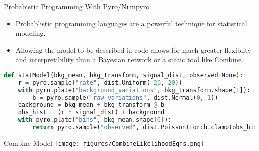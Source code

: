 \documentclass[10pt]{beamer}
\begin{document}
\begin{frame}[fragile]{Probabistic Programming With Pyro/Numpyro}
  \begin{itemize}
  \item Probablistic programming languages are a powerful technique for statistical modeling.
  \item Allowing the model to be described in code allows for much greater flexiblity and interpretibility than a Bayesian network or a static tool like Combine.
  \end{itemize}

  \begin{center}
\begin{lstlisting}[language=Python,
    basicstyle=\ttfamily\scriptsize,
]
def statModel(bkg_mean, bkg_transform, signal_dist, observed=None):
    r = pyro.sample("rate", dist.Uniform(-20, 20))
    with pyro.plate("background_variations", bkg_transform.shape[1]):
        b = pyro.sample("raw_variations", dist.Normal(0, 1))
    background = bkg_mean + bkg_transform @ b
    obs_hist = (r * signal_dist) + background
    with pyro.plate("bins", bkg_mean.shape[0]):
        return pyro.sample("observed", dist.Poisson(torch.clamp(obs_hist, 1)), obs=observed)
\end{lstlisting}
  \end{center}
\end{frame}

\begin{frame}{Combine Model}
    \centering
    \texttt{[image: figures/CombineLikelihoodEqns.png]}
\end{frame}
\end{document}
